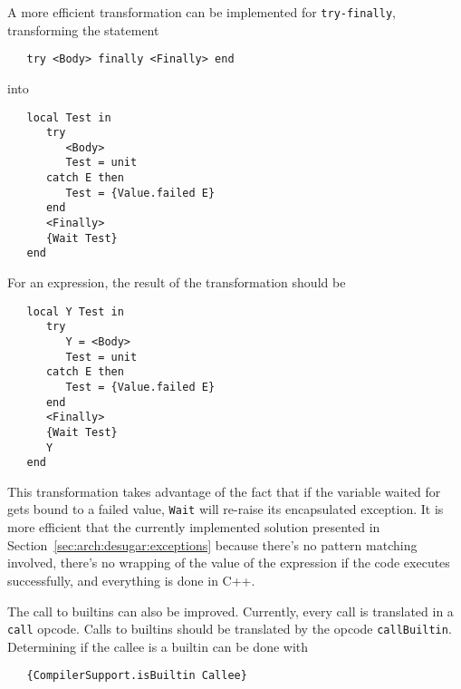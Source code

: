 \documentclass[a4paper]{memoir}
\begin{document}
A more efficient transformation can be implemented for \lstinline!try-finally!, 
transforming the statement
\begin{lstlisting}
   try <Body> finally <Finally> end
\end{lstlisting}
into
\begin{lstlisting}
   local Test in
      try
         <Body>
         Test = unit
      catch E then
         Test = {Value.failed E}
      end
      <Finally>
      {Wait Test}
   end
\end{lstlisting}

For an expression, the result of the transformation should be
\begin{lstlisting}
   local Y Test in
      try
         Y = <Body>
         Test = unit
      catch E then
         Test = {Value.failed E}
      end
      <Finally>
      {Wait Test}
      Y
   end
\end{lstlisting}
This transformation takes advantage of the fact that if the variable waited for
gets bound to a failed value, \lstinline!Wait! will re-raise its encapsulated
exception. 
It is more efficient that the currently implemented solution presented in Section~\ref{sec:arch:desugar:exceptions} because
there's no pattern matching involved,
there's no wrapping of the value of the expression if the code executes successfully, and everything is done in C++.


The call to builtins can also be improved. Currently, every call is translated in a \lstinline!call! opcode. Calls to builtins should
be translated by the opcode \lstinline!callBuiltin!. Determining if the callee is a builtin can be done with 
\begin{lstlisting}
   {CompilerSupport.isBuiltin Callee}
\end{lstlisting}
\end{document}
